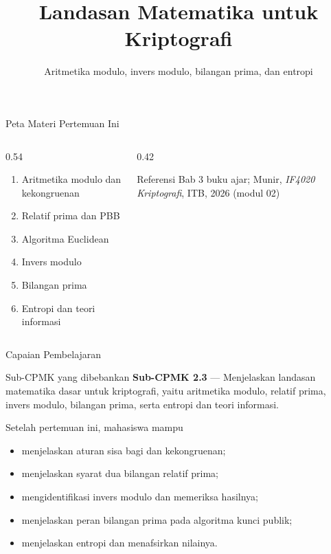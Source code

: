 \documentclass[aspectratio=169,11pt]{beamer}
\title{Landasan Matematika untuk Kriptografi}
\subtitle{Aritmetika modulo, invers modulo, bilangan prima, dan entropi}
\begin{document}
\begin{frame}[plain]
    \titlepage
\end{frame}

\begin{frame}{Peta Materi Pertemuan Ini}
    \begin{columns}[T,onlytextwidth]
        \begin{column}{0.54\textwidth}
            \begin{enumerate}
                \item Aritmetika modulo dan kekongruenan
                \item Relatif prima dan PBB
                \item Algoritma Euclidean
                \item Invers modulo
                \item Bilangan prima
                \item Entropi dan teori informasi
            \end{enumerate}
        \end{column}
        \begin{column}{0.42\textwidth}
            \begin{block}{Referensi}
                \footnotesize
                Bab 3 buku ajar; Munir, \textit{IF4020 Kriptografi},
                ITB, 2026 (modul 02)
            \end{block}
        \end{column}
    \end{columns}
\end{frame}

\begin{frame}{Capaian Pembelajaran}
    \begin{block}{Sub-CPMK yang dibebankan}
        \footnotesize
        \textbf{Sub-CPMK 2.3} --- Menjelaskan landasan matematika dasar untuk
        kriptografi, yaitu aritmetika modulo, relatif prima, invers modulo,
        bilangan prima, serta entropi dan teori informasi.
    \end{block}
    \vspace{0.2cm}
    \begin{exampleblock}{Setelah pertemuan ini, mahasiswa mampu}
        \begin{itemize}
            \item menjelaskan aturan sisa bagi dan kekongruenan;
            \item menjelaskan syarat dua bilangan relatif prima;
            \item mengidentifikasi invers modulo dan memeriksa hasilnya;
            \item menjelaskan peran bilangan prima pada algoritma kunci publik;
            \item menjelaskan entropi dan menafsirkan nilainya.
        \end{itemize}
    \end{exampleblock}
\end{frame}
\end{document}
